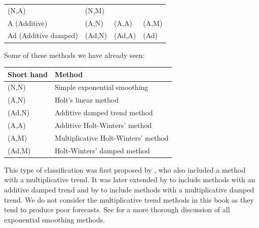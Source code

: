 \documentclass[]{book}
\begin{document}
\begin{longtable}[]{@{}llll@{}}
\begin{minipage}[t]{0.19\columnwidth}
(N,A)\strut
\end{minipage} & \begin{minipage}[t]{0.20\columnwidth}\raggedright
(N,M)\strut
\end{minipage}\tabularnewline
\begin{minipage}[t]{0.32\columnwidth}\raggedright
A (Additive)\strut
\end{minipage} & \begin{minipage}[t]{0.19\columnwidth}\raggedright
(A,N)\strut
\end{minipage} & \begin{minipage}[t]{0.19\columnwidth}\raggedright
(A,A)\strut
\end{minipage} & \begin{minipage}[t]{0.20\columnwidth}\raggedright
(A,M)\strut
\end{minipage}\tabularnewline
\begin{minipage}[t]{0.32\columnwidth}\raggedright
Ad (Additive damped)\strut
\end{minipage} & \begin{minipage}[t]{0.19\columnwidth}\raggedright
(Ad,N)\strut
\end{minipage} & \begin{minipage}[t]{0.19\columnwidth}\raggedright
(Ad,A)\strut
\end{minipage} & \begin{minipage}[t]{0.20\columnwidth}\raggedright
(Ad)\strut
\end{minipage}\tabularnewline
\bottomrule
\end{longtable}

Some of these methods we have already seen:

\begin{longtable}[]{@{}ll@{}}
\toprule
Short hand & Method\tabularnewline
\midrule
\endhead
(N,N) & Simple exponential smoothing\tabularnewline
(A,N) & Holt's linear method\tabularnewline
(Ad,N) & Additive damped trend method\tabularnewline
(A,A) & Additive Holt-Winters' method\tabularnewline
(A,M) & Multiplicative Holt-Winters' method\tabularnewline
(Ad,M) & Holt-Winters' damped method\tabularnewline
\bottomrule
\end{longtable}

This type of classification was first proposed by \citet{Pegels1969}, who also included a method with a multiplicative trend. It was later extended by \citet{Gar1985} to include methods with an additive damped trend and by \citet{Taylor2003} to include methods with a multiplicative damped trend. We do not consider the multiplicative trend methods in this book as they tend to produce poor forecasts. See \citet{expsmooth08} for a more thorough discussion of all exponential smoothing methods.
\end{document}
